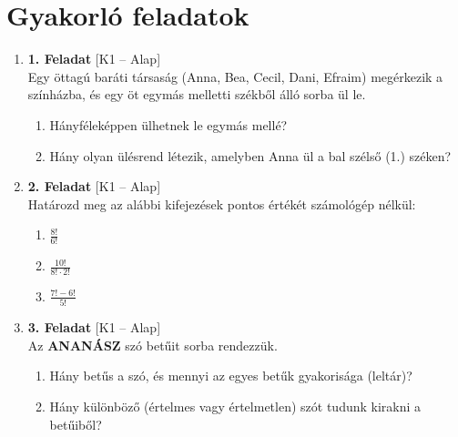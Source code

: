 \documentclass[12pt,a4paper]{article}
\begin{document}
\newpage

\section*{Gyakorló feladatok}

\begin{enumerate}[label=\arabic*., leftmargin=*]
    
    \item \textbf{1. Feladat} \textsf{\small [K1 – Alap]} \\
    Egy öttagú baráti társaság (Anna, Bea, Cecil, Dani, Efraim) megérkezik a színházba, és egy öt egymás melletti székből álló sorba ül le.
    \begin{enumerate}[label=\alph*)]
        \item Hányféleképpen ülhetnek le egymás mellé?
        \item Hány olyan ülésrend létezik, amelyben Anna ül a bal szélső (1.) széken?
    \end{enumerate}

    \vspace{0.4cm}

    \item \textbf{2. Feladat} \textsf{\small [K1 – Alap]} \\
    Határozd meg az alábbi kifejezések pontos értékét számológép nélkül:
    \begin{enumerate}[label=\alph*)]
        \item $\frac{8!}{6!}$
        \item $\frac{10!}{8! \cdot 2!}$
        \item $\frac{7! - 6!}{5!}$
    \end{enumerate}

    \vspace{0.4cm}

    \item \textbf{3. Feladat} \textsf{\small [K1 – Alap]} \\
    Az \textbf{ANANÁSZ} szó betűit sorba rendezzük. 
    \begin{enumerate}[label=\alph*)]
        \item Hány betűs a szó, és mennyi az egyes betűk gyakorisága (leltár)?
        \item Hány különböző (értelmes vagy értelmetlen) szót tudunk kirakni a betűiből?
    \end{enumerate}

    \vspace{0.4cm}


\end{enumerate}
\end{document}
